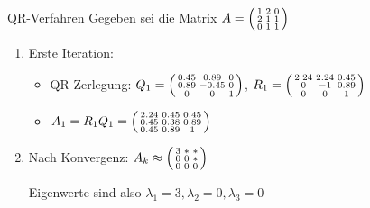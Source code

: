 \begin{example2}{QR-Verfahren}
Gegeben sei die Matrix
$A = \begin{psmallmatrix} 
1 & 2 & 0 \\
2 & 1 & 1 \\
0 & 1 & 1
\end{psmallmatrix}$

\begin{enumerate}
    \item Erste Iteration:
    \begin{itemize}
        \item QR-Zerlegung:
        $Q_1 = \begin{psmallmatrix} 
        0.45 & 0.89 & 0 \\
        0.89 & -0.45 & 0 \\
        0 & 0 & 1
        \end{psmallmatrix}$,
        $R_1 = \begin{psmallmatrix}
        2.24 & 2.24 & 0.45 \\
        0 & -1 & 0.89 \\
        0 & 0 & 1
        \end{psmallmatrix}$
        \item $A_1 = R_1Q_1 = \begin{psmallmatrix}
        2.24 & 0.45 & 0.45 \\
        0.45 & 0.38 & 0.89 \\
        0.45 & 0.89 & 1
        \end{psmallmatrix}$
    \end{itemize}

    \item Nach Konvergenz:
    $A_k \approx \begin{psmallmatrix}
    3 & * & * \\
    0 & 0 & * \\
    0 & 0 & 0
    \end{psmallmatrix}$

    Eigenwerte sind also $\lambda_1 = 3, \lambda_2 = 0, \lambda_3 = 0$
\end{enumerate}
\end{example2}







